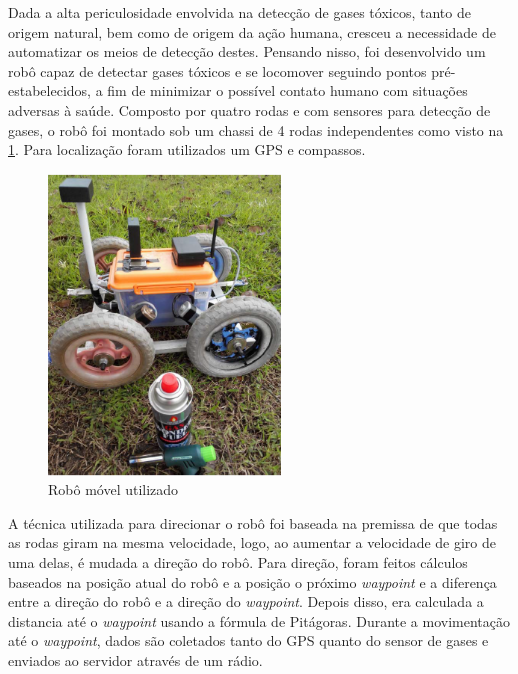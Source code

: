 Dada a alta periculosidade envolvida na detecção de gases tóxicos, tanto de origem natural, bem como de origem da ação humana, cresceu a necessidade de automatizar os meios de detecção destes. Pensando nisso, foi desenvolvido um robô capaz de detectar gases tóxicos e se locomover seguindo pontos pré-estabelecidos, a fim de minimizar o possível contato humano com situações adversas à saúde.  Composto por quatro rodas e com sensores para detecção de gases, o robô foi montado sob um chassi de 4 rodas independentes como visto na \ref{fig:gas:chassi}. Para localização foram utilizados um GPS e compassos.
\begin{figure}[H]
    \centering
    \includegraphics[width=0.55\textwidth]{figuras/chassi_robo_gas.png}
    \caption{Robô móvel utilizado}
    \label{fig:gas:chassi}
\end{figure}
A técnica utilizada para direcionar o robô foi baseada na premissa de que todas as rodas giram na mesma velocidade, logo, ao aumentar a velocidade de giro de uma delas, é mudada a direção do robô. Para direção, foram feitos cálculos baseados na posição atual do robô e a posição o próximo \textit{waypoint} e a diferença entre a direção do robô e a direção do \textit{waypoint}. Depois disso, era calculada a distancia até o \textit{waypoint} usando a fórmula de Pitágoras. Durante a movimentação até o \textit{waypoint}, dados são coletados tanto do GPS quanto do sensor de gases e enviados ao servidor através de um rádio.

